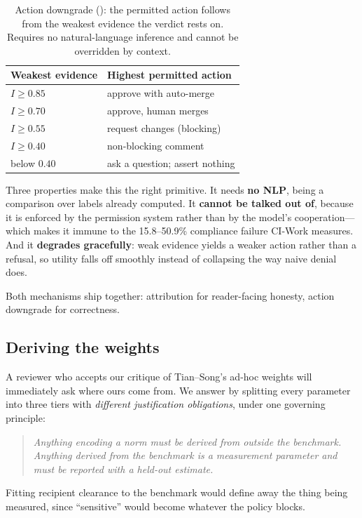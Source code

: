 \documentclass[conference,compsoc]{IEEEtran}
\newcommand{\Il}{\ensuremath{I}}                 %
\begin{document}
\begin{table}[t]
\centering
\caption{Action downgrade (): the permitted action follows
from the weakest evidence the verdict rests on. Requires no
natural-language inference and cannot be overridden by context.}
\label{tab:downgrade}
\footnotesize
\begin{tabular}{@{}lp{}@{}}
\toprule
\textbf{Weakest evidence} & \textbf{Highest permitted action} \\
\midrule
$\Il \ge 0.85$ & approve with auto-merge \\
$\Il \ge 0.70$ & approve, human merges \\
$\Il \ge 0.55$ & request changes (blocking) \\
$\Il \ge 0.40$ & non-blocking comment \\
below $0.40$   & ask a question; assert nothing \\
\bottomrule
\end{tabular}
\end{table}

Three properties make this the right primitive. It needs \textbf{no NLP}, being
a comparison over labels already computed. It \textbf{cannot be talked out of},
because it is enforced by the permission system rather than by the model's
cooperation---which makes it immune to the 15.8--50.9\% compliance failure
CI-Work measures. And it \textbf{degrades gracefully}: weak evidence yields a
weaker action rather than a refusal, so utility falls off smoothly instead of
collapsing the way naive denial does.

Both mechanisms ship together: attribution for reader-facing honesty, action
downgrade for correctness.

\subsection{Deriving the weights}
\label{sec:method:weights}

A reviewer who accepts our critique of Tian--Song's ad-hoc weights will
immediately ask where ours come from. We answer by splitting every parameter
into three tiers with \emph{different justification obligations}, under one
governing principle:
\begin{quote}
\emph{Anything encoding a norm must be derived from outside the benchmark.
Anything derived from the benchmark is a measurement parameter and must be
reported with a held-out estimate.}
\end{quote}
Fitting recipient clearance to the benchmark would define away the thing being
measured, since ``sensitive'' would become whatever the policy blocks.
\end{document}
